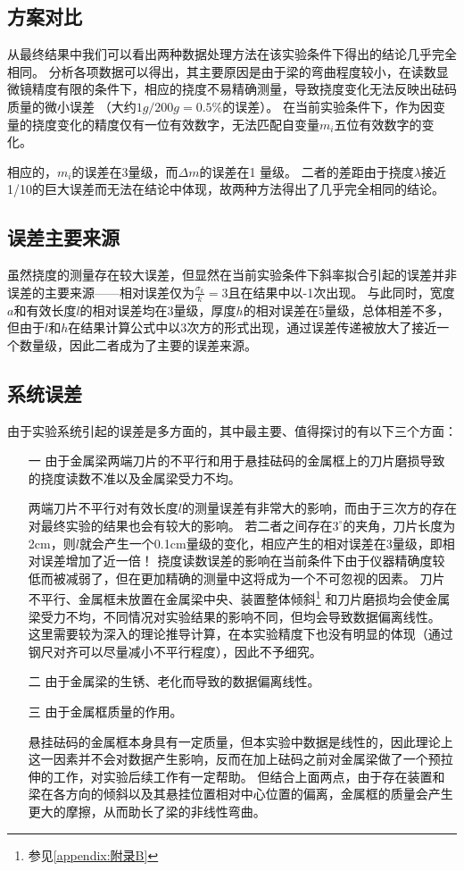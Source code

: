 \documentclass[12pt, a4paper]{ctexart}
\begin{document}
\subsection{方案对比}
从最终结果中我们可以看出两种数据处理方法在该实验条件下得出的结论几乎完全相同。
分析各项数据可以得出，其主要原因是由于梁的弯曲程度较小，在读数显微镜精度有限的条件下，相应的挠度不易精确测量，导致挠度变化无法反映出砝码质量的微小误差
（大约$1g/200g = 0.5\% $的误差）。
在当前实验条件下，作为因变量的挠度变化的精度仅有一位有效数字，无法匹配自变量$m_i$五位有效数字的变化。

相应的，$m_i$的误差在3\textpertenthousand 量级，而$\Delta m$的误差在1 \textperthousand 量级。
二者的差距由于挠度$\lambda$接近1/10的巨大误差而无法在结论中体现，故两种方法得出了几乎完全相同的结论。

\subsection{误差主要来源}
虽然挠度的测量存在较大误差，但显然在当前实验条件下斜率拟合引起的误差并非误差的主要来源——相对误差仅为$\frac{\sigma_k}k = $3\textpertenthousand 且在结果中以-1次出现。
与此同时，宽度$a$和有效长度$l$的相对误差均在3\textperthousand 量级，厚度$h$的相对误差在5\textperthousand 量级，总体相差不多，
但由于$l$和$h$在结果计算公式中以3次方的形式出现，通过误差传递被放大了接近一个数量级，因此二者成为了主要的误差来源。

\subsection{系统误差}
由于实验系统引起的误差是多方面的，其中最主要、值得探讨的有以下三个方面：
\begin{enumerate}
    \item[一] 由于金属梁两端刀片的不平行和用于悬挂砝码的金属框上的刀片磨损导致的挠度读数不准以及金属梁受力不均。
    
    两端刀片不平行对有效长度$l$的测量误差有非常大的影响，而由于三次方的存在对最终实验的结果也会有较大的影响。
    若二者之间存在$3^{\circ}$的夹角，刀片长度为2cm，则$l$就会产生一个0.1cm量级的变化，相应产生的相对误差在3\textperthousand 量级，即相对误差增加了近一倍！
    挠度读数误差的影响在当前条件下由于仪器精确度较低而被减弱了，但在更加精确的测量中这将成为一个不可忽视的因素。
    刀片不平行、金属框未放置在金属梁中央、装置整体倾斜\footnote{参见\ref{appendix:附录B}} 和刀片磨损均会使金属梁受力不均，不同情况对实验结果的影响不同，但均会导致数据偏离线性。
    这里需要较为深入的理论推导计算，在本实验精度下也没有明显的体现（通过钢尺对齐可以尽量减小不平行程度），因此不予细究。
    \item[二] 由于金属梁的生锈、老化而导致的数据偏离线性。
    \item[三] 由于金属框质量的作用。
    
    悬挂砝码的金属框本身具有一定质量，但本实验中数据是线性的，因此理论上这一因素并不会对数据产生影响，反而在加上砝码之前对金属梁做了一个预拉伸的工作，对实验后续工作有一定帮助。
    但结合上面两点，由于存在装置和梁在各方向的倾斜以及其悬挂位置相对中心位置的偏离，金属框的质量会产生更大的摩擦，从而助长了梁的非线性弯曲。
\end{enumerate}
\end{document}
